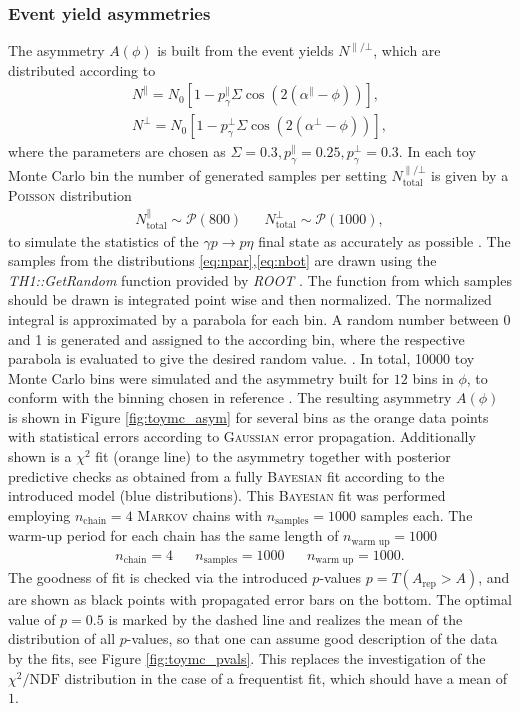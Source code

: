 \subsubsection{Event yield asymmetries}
The asymmetry $A\left(\phi\right)$ is built from the event yields $N^{\parallel/\bot}$, which are distributed according to
\begin{align}
	N^{\parallel}=N_0\left[1-p_\gamma^\parallel\Sigma\cos\left(2\left(\alpha^\parallel-\phi\right)\right)\right],\label{eq:npar}\\
	N^{\bot}=N_0\left[1-p_\gamma^\bot\Sigma\cos\left(2\left(\alpha^\bot-\phi\right)\right)\right],
	\label{eq:nbot}
\end{align}
where the parameters are chosen as $\Sigma=0.3,p_\gamma^\parallel=0.25,p_\gamma^\bot=0.3$. In each toy Monte Carlo bin the number of generated samples per setting $N_\text{total}^{\parallel/\bot}$ is given by a \textsc{Poisson} distribution
\begin{align}
N_\text{total}^\parallel \sim \mathcal{P}(800) && N_\text{total}^\bot \sim \mathcal{P}(1000),
\end{align}
to simulate the statistics of the $\gamma p \to p\eta$ final state as accurately as possible \cite{farahphd}. The samples from the distributions \eqref{eq:npar},\eqref{eq:nbot} are drawn using the \emph{TH1::GetRandom} \cite{rrandom} function provided by \emph{ROOT} \cite{root}. The function from which samples should be drawn is integrated point wise and then normalized. The normalized integral is approximated by a parabola for each bin. A random number between 0 and 1 is generated and assigned to the according bin, where the respective parabola is evaluated to give the desired random value. \cite{rrandom}.
\noindent In total, 10000 toy Monte Carlo bins were simulated and the asymmetry built for $12$ bins in $\phi$, to conform with the binning chosen in reference \cite{farahphd}. The resulting asymmetry $A\left(\phi\right)$ is shown in Figure \ref{fig:toymc_asym} for several bins as the orange data points with statistical errors according to \textsc{Gaussian} error propagation. Additionally shown is a $\chi^2$ fit (orange line) to the asymmetry together with posterior predictive checks as obtained from a fully \textsc{Bayesian} fit according to the introduced model (blue distributions). This \textsc{Bayesian} fit was performed employing $n_\text{chain}=4$ \textsc{Markov} chains with $n_\text{samples}=1000$ samples each. The warm-up period for each chain has the same length of $n_\text{warm up}=1000$
\begin{align}
	n_\text{chain}=4 && n_\text{samples}=1000 && n_\text{warm up}=1000.
\end{align}
The goodness of fit is checked via the introduced $p$-values $p=T(A_\text{rep}>A)$, and are shown as black points with propagated error bars on the bottom. The optimal value of $p=0.5$ is marked by the dashed line and realizes the mean of the distribution of all $p$-values, so that one can assume good description of the data by the fits, see Figure \ref{fig:toymc_pvals}. This replaces the investigation of the $\chi^2/\text{NDF}$ distribution in the case of a frequentist fit, which should have a mean of $1$.  


